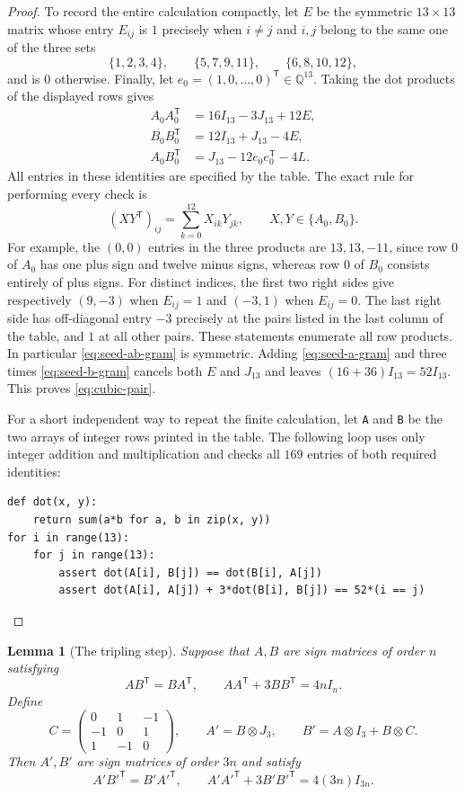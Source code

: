 \documentclass[10pt]{article}
\newtheorem{lemma}[theorem]{Lemma}
\newcommand{\Q}{\mathbb Q}
\begin{document}
\begin{proof}
To record the entire calculation compactly, let $E$ be the symmetric
$13\times13$ matrix whose entry $E_{ij}$ is $1$ precisely when $i\ne j$
and $i,j$ belong to the same one of the three sets
\[
 \{1,2,3,4\},\qquad\{5,7,9,11\},\qquad\{6,8,10,12\},
\]
and is $0$ otherwise. Finally, let $e_0=(1,0,\ldots,0)^{\mathsf T}
\in\Q^{13}$. Taking the dot products of the displayed rows gives
\begin{align}
 A_0A_0^{\mathsf T}&=16I_{13}-3J_{13}+12E,\label{eq:seed-a-gram}\\
 B_0B_0^{\mathsf T}&=12I_{13}+J_{13}-4E,\label{eq:seed-b-gram}\\
 A_0B_0^{\mathsf T}&=J_{13}-12e_0e_0^{\mathsf T}-4L.
 \label{eq:seed-ab-gram}
\end{align}
All entries in these identities are specified by the table. The exact
rule for performing every check is
\[
 (XY^{\mathsf T})_{ij}=\sum_{k=0}^{12}X_{ik}Y_{jk},
       \qquad X,Y\in\{A_0,B_0\}.
\]
For example, the $(0,0)$ entries in the three products are
$13,13,-11$, since row $0$ of $A_0$ has one plus sign and twelve
minus signs, whereas row $0$ of $B_0$ consists entirely of plus signs.
For distinct indices, the first two right sides give respectively
$(9,-3)$ when $E_{ij}=1$ and $(-3,1)$ when $E_{ij}=0$.
The last right side has off-diagonal entry $-3$ precisely at the
pairs listed in the last column of the table, and $1$ at all other
pairs. These statements enumerate all row products.
In particular \eqref{eq:seed-ab-gram} is symmetric. Adding
\eqref{eq:seed-a-gram} and three times \eqref{eq:seed-b-gram} cancels
both $E$ and $J_{13}$ and leaves $(16+36)I_{13}=52I_{13}$.
This proves \eqref{eq:cubic-pair}.

For a short independent way to repeat the finite calculation, let
\texttt{A} and \texttt{B} be the two arrays of integer rows printed in
the table. The following loop uses only integer addition and
multiplication and checks all $169$ entries of both required identities:
\begin{verbatim}
def dot(x, y):
    return sum(a*b for a, b in zip(x, y))
for i in range(13):
    for j in range(13):
        assert dot(A[i], B[j]) == dot(B[i], A[j])
        assert dot(A[i], A[j]) + 3*dot(B[i], B[j]) == 52*(i == j)
\end{verbatim}
\end{proof}

\begin{lemma}[The tripling step]\label{lem:tripling-step}
Suppose that $A,B$ are sign matrices of order $n$ satisfying
\begin{equation}\label{eq:general-cubic-pair}
 AB^{\mathsf T}=BA^{\mathsf T},\qquad
 AA^{\mathsf T}+3BB^{\mathsf T}=4nI_n.
\end{equation}
Define
\[
 C=\begin{pmatrix}0&1&-1\\-1&0&1\\1&-1&0\end{pmatrix},
 \qquad A'=B\otimes J_3,
 \qquad B'=A\otimes I_3+B\otimes C.
\]
Then $A',B'$ are sign matrices of order $3n$ and satisfy
\[
 A'B'^{\mathsf T}=B'A'^{\mathsf T},\qquad
 A'A'^{\mathsf T}+3B'B'^{\mathsf T}=4(3n)I_{3n}.
\]
\end{lemma}
\end{document}
